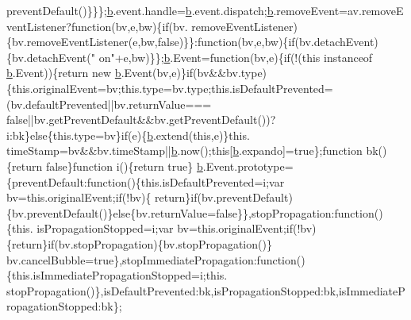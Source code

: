 \begin{DoxyCode}
      preventDefault()\}\}\};\hyperlink{a00039_aa4026ad5544b958e54ce5e106fa1c805}{b}.event.handle=\hyperlink{a00039_aa4026ad5544b958e54ce5e106fa1c805}{b}.event.dispatch;\hyperlink{a00039_aa4026ad5544b958e54ce5e106fa1c805}{b}.removeEvent=av.removeEventListener?\textcolor{keyword}{function}(bv,e,bw)\{\textcolor{keywordflow}{if}(bv.
      removeEventListener)\{bv.removeEventListener(e,bw,\textcolor{keyword}{false})\}\}:\textcolor{keyword}{function}(bv,e,bw)\{\textcolor{keywordflow}{if}(bv.detachEvent)\{bv.detachEvent(\textcolor{stringliteral}{"
      on"}+e,bw)\}\};\hyperlink{a00039_aa4026ad5544b958e54ce5e106fa1c805}{b}.Event=\textcolor{keyword}{function}(bv,e)\{\textcolor{keywordflow}{if}(!(\textcolor{keyword}{this} instanceof \hyperlink{a00039_aa4026ad5544b958e54ce5e106fa1c805}{b}.Event))\{\textcolor{keywordflow}{return} \textcolor{keyword}{new} \hyperlink{a00039_aa4026ad5544b958e54ce5e106fa1c805}{b}.Event(bv,e)\}\textcolor{keywordflow}{if}(bv&&bv.type)
      \{this.originalEvent=bv;this.type=bv.type;this.isDefaultPrevented=(bv.defaultPrevented||bv.returnValue===\textcolor{keyword}{
      false}||bv.getPreventDefault&&bv.getPreventDefault())?i:bk\}\textcolor{keywordflow}{else}\{this.type=bv\}\textcolor{keywordflow}{if}(e)\{\hyperlink{a00039_aa4026ad5544b958e54ce5e106fa1c805}{b}.extend(\textcolor{keyword}{this},e)\}this.
      timeStamp=bv&&bv.timeStamp||\hyperlink{a00039_aa4026ad5544b958e54ce5e106fa1c805}{b}.now();\textcolor{keyword}{this}[\hyperlink{a00039_aa4026ad5544b958e54ce5e106fa1c805}{b}.expando]=\textcolor{keyword}{true}\};\textcolor{keyword}{function} bk()\{\textcolor{keywordflow}{return} \textcolor{keyword}{false}\}\textcolor{keyword}{function} i()\{\textcolor{keywordflow}{return} \textcolor{keyword}{true}\}
      \hyperlink{a00039_aa4026ad5544b958e54ce5e106fa1c805}{b}.Event.prototype=\{preventDefault:\textcolor{keyword}{function}()\{this.isDefaultPrevented=i;var bv=this.originalEvent;\textcolor{keywordflow}{if}(!bv)\{\textcolor{keywordflow}{
      return}\}\textcolor{keywordflow}{if}(bv.preventDefault)\{bv.preventDefault()\}\textcolor{keywordflow}{else}\{bv.returnValue=\textcolor{keyword}{false}\}\},stopPropagation:\textcolor{keyword}{function}()\{this.
      isPropagationStopped=i;var bv=this.originalEvent;\textcolor{keywordflow}{if}(!bv)\{\textcolor{keywordflow}{return}\}\textcolor{keywordflow}{if}(bv.stopPropagation)\{bv.stopPropagation()\}
      bv.cancelBubble=\textcolor{keyword}{true}\},stopImmediatePropagation:\textcolor{keyword}{function}()\{this.isImmediatePropagationStopped=i;this.
      stopPropagation()\},isDefaultPrevented:bk,isPropagationStopped:bk,isImmediatePropagationStopped:bk\};

\end{DoxyCode}
